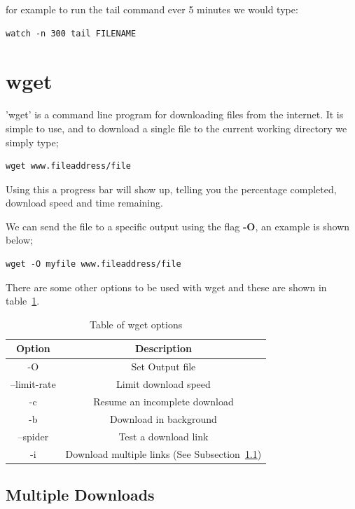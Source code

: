

for example to run the tail command ever 5 minutes we would type:

\begin{lstlisting}
watch -n 300 tail FILENAME
\end{lstlisting}

\section{wget}

'wget' is a command line program for downloading files from the internet.  It is simple to use, and to download a single file to the current working directory we simply type;

\begin{lstlisting}
wget www.fileaddress/file
\end{lstlisting}

Using this a progress bar will show up, telling you the percentage completed, download speed and time remaining.

We can send the file to a specific output using the flag \textbf{-O}, an example is shown below;

\begin{lstlisting}
wget -O myfile www.fileaddress/file
\end{lstlisting}

There are some other options to be used with wget and these are shown in table~\ref{tab:wget}.

\begin{table}[!th]
\centering
\begin{tabular}{cc}
\hline
Option & Description\\
\hline
-O & Set Output file\\
--limit-rate & Limit download speed\\
-c & Resume an incomplete download\\
-b & Download in background\\
--spider & Test a download link\\
-i & Download multiple links (See Subsection~\ref{ssec:multidown})\\
\hline
\end{tabular}
\caption{Table of wget options}
\label{tab:wget}
\end{table}

\subsection{Multiple Downloads}
\label{ssec:multidown}

